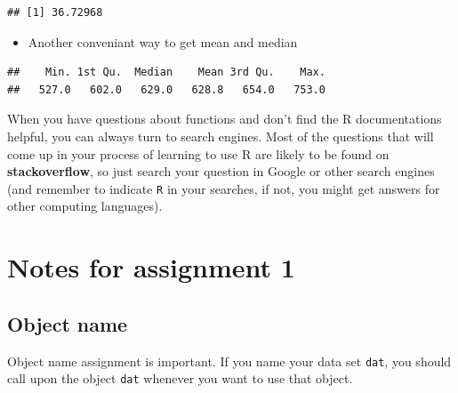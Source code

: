 \documentclass[
]{book}
\newenvironment{Shaded}{\begin{snugshade}}{\end{snugshade}}
\newcommand{\FunctionTok}[1]{\textcolor[rgb]{0.13,0.29,0.53}{\textbf{#1}}}
\newcommand{\NormalTok}[1]{#1}
\newcommand{\OtherTok}[1]{\textcolor[rgb]{0.56,0.35,0.01}{#1}}
\newcommand{\SpecialCharTok}[1]{\textcolor[rgb]{0.81,0.36,0.00}{\textbf{#1}}}
\newcommand{\StringTok}[1]{\textcolor[rgb]{0.31,0.60,0.02}{#1}}
\providecommand{\tightlist}{%
  \setlength{\itemsep}{0pt}\setlength{\parskip}{0pt}}
\begin{document}
\begin{verbatim}
## [1] 36.72968
\end{verbatim}

\begin{itemize}
\tightlist
\item
  Another conveniant way to get mean and median
\end{itemize}

\begin{Shaded}
\end{Shaded}

\begin{verbatim}
##    Min. 1st Qu.  Median    Mean 3rd Qu.    Max. 
##   527.0   602.0   629.0   628.8   654.0   753.0
\end{verbatim}

When you have questions about functions and don't find the R documentations helpful, you can always turn to search engines. Most of the questions that will come up in your process of learning to use R are likely to be found on \textbf{stackoverflow}, so just search your question in Google or other search engines (and remember to indicate \texttt{R} in your searches, if not, you might get answers for other computing languages).

\section{Notes for assignment 1}\label{notes-for-assignment-1}

\subsection*{Object name}\label{object-name}

Object name assignment is important. If you name your data set \texttt{dat}, you should call upon the object \texttt{dat} whenever you want to use that object.

\begin{Shaded}
\end{Shaded}
\end{document}
